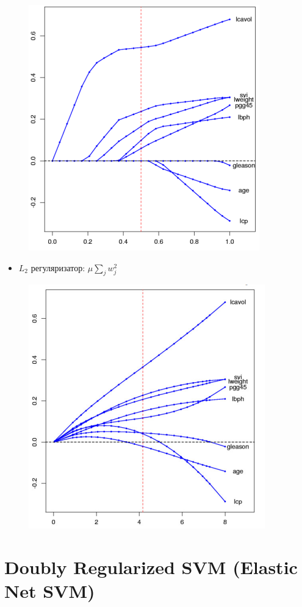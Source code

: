 \begin{figure}[ht]
    \centering
    \includegraphics[width=0.6 \linewidth]{chapters/svm/images/L_1.png}
    \label{fig:image_1}    
\end{figure}

\begin{itemize}
    \item \(L_2\) регуляризатор: \(\mu \sum_{j} w_j^2\)
\end{itemize}

\begin{figure}[ht]
    \centering
    \includegraphics[width=0.6 \linewidth]{chapters/svm/images/L_2.png}
    \label{fig:image_2}    
\end{figure}

\section{Doubly Regularized SVM (Elastic Net SVM)}

